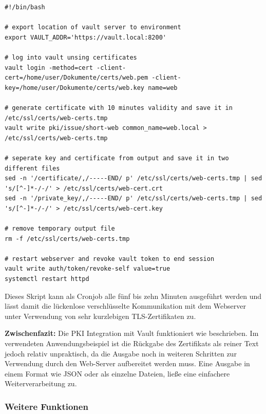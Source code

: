 \documentclass[
book,
a4paper,   
titlepage,  
halfparskip,
12pt        
]{scrartcl}
\begin{document}
\begin{onehalfspacing}
\begin{lstlisting}[caption={[Skript PKI] Shell Skript zum Erstellen eines neuen Serverzertifikats unter Verwendung der Vault \ac{PKI}}, label=lst:skript, captionpos=b, basicstyle=\ttfamily] 
#!/bin/bash

# export location of vault server to environment
export VAULT_ADDR='https://vault.local:8200'

# log into vault unsing certificates
vault login -method=cert -client-cert=/home/user/Dokumente/certs/web.pem -client-key=/home/user/Dokumente/certs/web.key name=web

# generate certificate with 10 minutes validity and save it in /etc/ssl/certs/web-certs.tmp
vault write pki/issue/short-web common_name=web.local > /etc/ssl/certs/web-certs.tmp

# seperate key and certificate from output and save it in two different files
sed -n '/certificate/,/-----END/ p' /etc/ssl/certs/web-certs.tmp | sed 's/[^-]*-/-/' > /etc/ssl/certs/web-cert.crt
sed -n '/private_key/,/-----END/ p' /etc/ssl/certs/web-certs.tmp | sed 's/[^-]*-/-/' > /etc/ssl/certs/web-cert.key

# remove temporary output file
rm -f /etc/ssl/certs/web-certs.tmp

# restart webserver and revoke vault token to end session
vault write auth/token/revoke-self value=true
systemctl restart httpd

\end{lstlisting}

Dieses Skript kann als Cronjob alle fünf bis zehn Minuten ausgeführt werden und lässt damit die lückenlose verschlüsselte Kommunikation mit dem Webserver unter Verwendung von sehr kurzlebigen \ac{TLS}-Zertifikaten zu. 

\textbf{Zwischenfazit:} Die PKI Integration mit Vault funktioniert wie beschrieben. Im verwendeten Anwendungsbeispiel ist die Rückgabe des Zertifikats als reiner Text jedoch relativ unpraktisch, da die Ausgabe noch in weiteren Schritten zur Verwendung durch den Web-Server aufbereitet werden muss. Eine Ausgabe in einem Format wie \ac{JSON} oder als einzelne Dateien, ließe eine einfachere Weiterverarbeitung zu.

\subsubsection{Weitere Funktionen}


\end{onehalfspacing}
\end{document}
